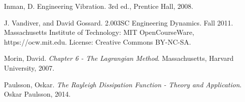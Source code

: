 

\begin{thebibliography}{99}


\bibitem{}
Inman, D. Engineering Vibration. 3rd ed., Prentice Hall, 2008.

\bibitem{}
J. Vandiver, and David Gossard. 2.003SC Engineering Dynamics. Fall 2011. Massachusetts Institute of Technology: MIT OpenCourseWare, https://ocw.mit.edu. License: Creative Commons BY-NC-SA.

Morin, David. \emph{Chapter 6 - The Lagrangian Method}. Massachusetts, Harvard University, 2007.

Paulsson, Oskar. \emph{The Rayleigh Dissipation Function - Theory and Application}. Oskar Paulsson, 2014.



\end{thebibliography}



